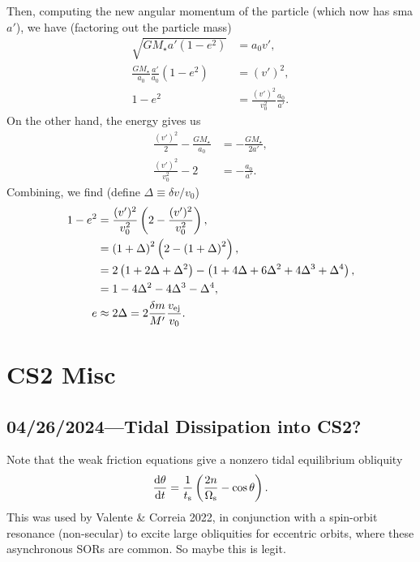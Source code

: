 \documentclass[12pt]{article}
\newcommand*{\rd}[2]{\frac{\mathrm{d}#1}{\mathrm{d}#2}}
\newcommand*{\p}[1]{\left(#1\right)}
\begin{document}
Then, computing the new angular momentum of the particle (which now has sma
$a'$), we have (factoring out the particle mass)
\begin{align}
    \sqrt{GM_\star a'(1 - e^2)} &= a_0v',\\
    \frac{GM_\star}{a_0}\frac{a'}{a_0}(1 - e^2) &= (v')^2,\\
    1 - e^2 &= \frac{(v')^2}{v_0^2}\frac{a_0}{a'}.
\end{align}
On the other hand, the energy gives us
\begin{align}
    \frac{(v')^2}{2} - \frac{GM_\star}{a_0} &= -\frac{GM_\star}{2a'},\\
    \frac{(v')^2}{v_0^2} - 2 &= -\frac{a_0}{a'}.
\end{align}
Combining, we find (define $\Delta \equiv \delta v / v_0$)
\begin{align}
    1 - e^2 &= \frac{(v')^2}{v_0^2}\p{2 - \frac{(v')^2}{v_0^2}},\\
        &= \p{1 + \Delta}^2\p{2 - \p{1 + \Delta}^2},\\
        &= 2\p{1 + 2\Delta + \Delta^2}
            - \p{1 + 4\Delta + 6\Delta^2 + 4\Delta^3 + \Delta^4},\\
        &= 1 - 4\Delta^2 - 4\Delta^3 - \Delta^4,\\
    e &\approx 2\Delta = 2\frac{\delta m}{M'}\frac{v_{\rm ej}}{v_0}.
\end{align}

\section{CS2 Misc}

\subsection{04/26/2024---Tidal Dissipation into CS2?}

Note that the weak friction equations give a nonzero tidal equilibrium obliquity
\begin{equation}
    \rd{\theta}{t} = \frac{1}{t_{\rm s}}
        \p{\frac{2n}{\Omega_{\rm s}} - \cos \theta}.
\end{equation}
This was used by Valente \& Correia 2022, in conjunction with a spin-orbit
resonance (non-secular) to excite large obliquities for eccentric orbits, where
these asynchronous SORs are common. So maybe this is legit.
\end{document}
